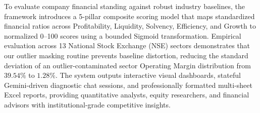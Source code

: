 \documentclass[12pt,oneside]{report}
\begin{document}
To evaluate company financial standing against robust industry baselines, the framework introduces a 5-pillar composite scoring model that maps standardized financial ratios across Profitability, Liquidity, Solvency, Efficiency, and Growth to normalized 0--100 scores using a bounded Sigmoid transformation. Empirical evaluation across 13 National Stock Exchange (NSE) sectors demonstrates that our outlier masking routine prevents baseline distortion, reducing the standard deviation of an outlier-contaminated sector Operating Margin distribution from $39.54\%$ to $1.28\%$. The system outputs interactive visual dashboards, stateful Gemini-driven diagnostic chat sessions, and professionally formatted multi-sheet Excel reports, providing quantitative analysts, equity researchers, and financial advisors with institutional-grade competitive insights.

\newpage
{}
\pagestyle{fancy}
\ifdefined\isgreyscale
\fi








\newpage
{}
{}



\newpage
\appendix
{}
\let\origaddcontentsline\addcontentsline
\renewcommand{\addcontentsline}[3]{%
  \ifstrequal{#2}{chapter}{%
    \origaddcontentsline{#1}{#2}{Appendix: Core Source Code}%
  }{%
    \origaddcontentsline{#1}{#2}{#3}%
  }%
}

\end{document}
